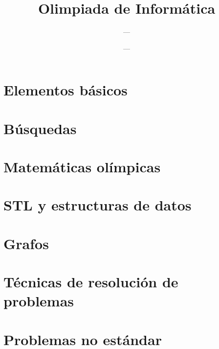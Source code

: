 \documentclass[12pt]{book}
\begin{document}
	
	
\title{Olimpiada de Informática}
\author{---}
\date{---}
\setcounter{tocdepth}{1}
\frontmatter

\maketitle
\tableofcontents

\mainmatter

\part{Elementos básicos}

\part{Búsquedas}


















\part{Matemáticas olímpicas}

\part{STL y estructuras de datos}

\part{Grafos}

\part{Técnicas de resolución de problemas}

\part{Problemas no estándar}

\backmatter
\end{document}
